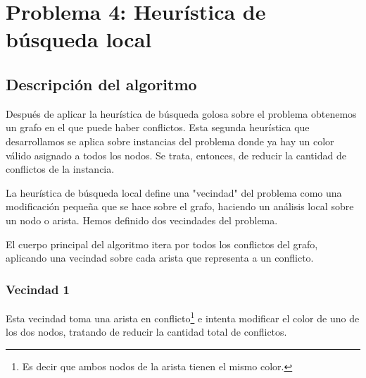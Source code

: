 \section{Problema 4: Heurística de búsqueda local}

\subsection{Descripción del algoritmo}

Después de aplicar la heurística de búsqueda golosa sobre el problema obtenemos un grafo en el que puede haber conflictos. Esta segunda heurística que desarrollamos se aplica sobre instancias del problema donde ya hay un color válido asignado a todos los nodos. Se trata, entonces, de reducir la cantidad de conflictos de la instancia.

La heurística de búsqueda local define una "vecindad" del problema como una modificación pequeña que se hace sobre el grafo, haciendo un análisis local sobre un nodo o arista. Hemos definido dos vecindades del problema.

El cuerpo principal del algoritmo itera por todos los conflictos del grafo, aplicando una vecindad sobre cada arista que representa a un conflicto.

\subsubsection{Vecindad 1}

Esta vecindad toma una arista en conflicto\footnote{Es decir que ambos nodos de la arista tienen el mismo color.} e intenta modificar el color de uno de los dos nodos, tratando de reducir la cantidad total de conflictos.


